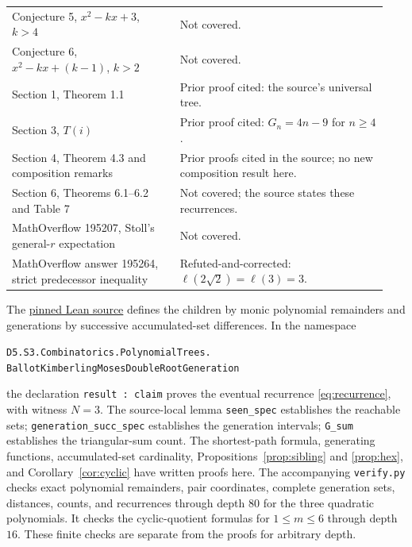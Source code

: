 \documentclass[11pt]{article}
\begin{document}
\begin{longtable}{@{}p{0.42\linewidth}p{0.52\linewidth}@{}}
Conjecture 5, $x^2-kx+3$, $k>4$ & Not covered.\\
Conjecture 6, $x^2-kx+(k-1)$, $k>2$ & Not covered.\\
Section 1, Theorem 1.1 & Prior proof cited: the source's universal tree.\\
Section 3, $T(i)$ & Prior proof cited: $G_n=4n-9$ for $n\geq4$.\\
Section 4, Theorem 4.3 and composition remarks & Prior proofs cited in the source;
no new composition result here.\\
Section 6, Theorems 6.1--6.2 and Table 7 & Not covered; the source states
these recurrences.\\
MathOverflow 195207, Stoll's general-$r$ expectation & Not covered.\\
MathOverflow answer 195264, strict predecessor inequality & Refuted-and-corrected:
$\ell(2\sqrt2)=\ell(3)=3$.\\
\bottomrule
\end{longtable}
\normalsize

The \href{https://github.com/the-omega-institute/trureturing/blob/50f2a97bb5e704842f2c32c6095f68a0dc62c779/D5/S3/Combinatorics/PolynomialTrees/BallotKimberlingMosesDoubleRootGeneration.lean}{pinned Lean source}
defines the children by monic polynomial remainders and generations by
successive accumulated-set differences. In the namespace
\begin{center}\small
\texttt{D5.S3.Combinatorics.PolynomialTrees.}\\
\texttt{BallotKimberlingMosesDoubleRootGeneration}
\end{center}
the declaration \texttt{result : claim} proves the eventual recurrence
\eqref{eq:recurrence}, with witness $N=3$.
The source-local lemma \texttt{seen\_spec} establishes the reachable sets;
\texttt{generation\_succ\_spec} establishes the generation intervals;
\texttt{G\_sum} establishes the triangular-sum count.
The shortest-path formula, generating functions, accumulated-set
cardinality, Propositions~\ref{prop:sibling} and \ref{prop:hex}, and
Corollary~\ref{cor:cyclic} have written proofs here.
The accompanying \texttt{verify.py} checks exact polynomial remainders,
pair coordinates, complete generation sets, distances, counts, and
recurrences through depth $80$ for the three quadratic polynomials.
It checks the cyclic-quotient formulas for $1\leq m\leq6$ through depth $16$.
These finite checks
are separate from the proofs for arbitrary depth.
\end{document}
